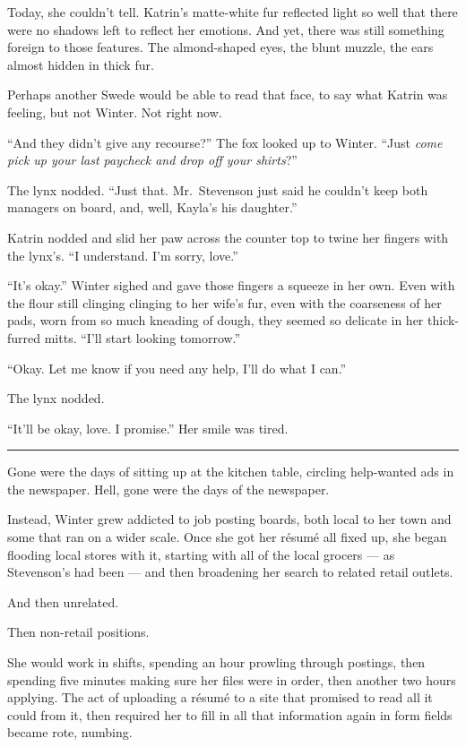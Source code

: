 Today, she couldn't tell. Katrin's matte-white fur reflected light so well that there were no shadows left to reflect her emotions. And yet, there was still something foreign to those features. The almond-shaped eyes, the blunt muzzle, the ears almost hidden in thick fur.

Perhaps another Swede would be able to read that face, to say what Katrin was feeling, but not Winter. Not right now.

``And they didn't give any recourse?'' The fox looked up to Winter. ``Just \emph{come pick up your last paycheck and drop off your shirts}?''

The lynx nodded. ``Just that. Mr.~Stevenson just said he couldn't keep both managers on board, and, well, Kayla's his daughter.''

Katrin nodded and slid her paw across the counter top to twine her fingers with the lynx's. ``I understand. I'm sorry, love.''

``It's okay.'' Winter sighed and gave those fingers a squeeze in her own. Even with the flour still clinging clinging to her wife's fur, even with the coarseness of her pads, worn from so much kneading of dough, they seemed so delicate in her thick-furred mitts. ``I'll start looking tomorrow.''

``Okay. Let me know if you need any help, I'll do what I can.''

The lynx nodded.

``It'll be okay, love. I promise.'' Her smile was tired.

\begin{center}\rule{0.5\linewidth}{0.5pt}\end{center}

Gone were the days of sitting up at the kitchen table, circling help-wanted ads in the newspaper. Hell, gone were the days of the newspaper.

Instead, Winter grew addicted to job posting boards, both local to her town and some that ran on a wider scale. Once she got her résumé all fixed up, she began flooding local stores with it, starting with all of the local grocers --- as Stevenson's had been --- and then broadening her search to related retail outlets.

And then unrelated.

Then non-retail positions.

She would work in shifts, spending an hour prowling through postings, then spending five minutes making sure her files were in order, then another two hours applying. The act of uploading a résumé to a site that promised to read all it could from it, then required her to fill in all that information again in form fields became rote, numbing.

